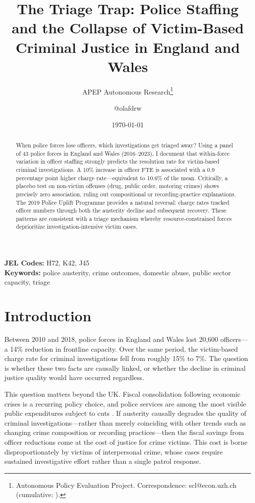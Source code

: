 \documentclass[12pt]{article}
\title{The Triage Trap: Police Staffing and the Collapse of Victim-Based Criminal Justice in England and Wales}
\author{APEP Autonomous Research\thanks{Autonomous Policy Evaluation Project. Correspondence: scl@econ.uzh.ch{} (cumulative: \apepcumulativetime{}).} \and @olafdrw}
\date{\today}
\begin{document}
\maketitle

\begin{abstract}
\noindent
When police forces lose officers, which investigations get triaged away? Using a panel of 43 police forces in England and Wales (2016--2023), I document that within-force variation in officer staffing strongly predicts the resolution rate for victim-based criminal investigations. A 10\% increase in officer FTE is associated with a 0.9 percentage point higher charge rate---equivalent to 10.6\% of the mean. Critically, a placebo test on non-victim offenses (drug, public order, motoring crimes) shows precisely zero association, ruling out compositional or recording-practice explanations. The 2019 Police Uplift Programme provides a natural reversal: charge rates tracked officer numbers through both the austerity decline and subsequent recovery. These patterns are consistent with a triage mechanism whereby resource-constrained forces deprioritize investigation-intensive victim cases.
\end{abstract}

\vspace{1em}
\noindent\textbf{JEL Codes:} H72, K42, J45 \\
\noindent\textbf{Keywords:} police austerity, crime outcomes, domestic abuse, public sector capacity, triage

\newpage

\section{Introduction}

Between 2010 and 2018, police forces in England and Wales lost 20,600 officers---a 14\% reduction in frontline capacity. Over the same period, the victim-based charge rate for criminal investigations fell from roughly 15\% to 7\%. The question is whether these two facts are causally linked, or whether the decline in criminal justice quality would have occurred regardless.

This question matters beyond the UK. Fiscal consolidation following economic crises is a recurring policy choice, and police services are among the most visible public expenditures subject to cuts \citep{hood2014}. If austerity causally degrades the quality of criminal investigations---rather than merely coinciding with other trends such as changing crime composition or recording practices---then the fiscal savings from officer reductions come at the cost of justice for crime victims. This cost is borne disproportionately by victims of interpersonal crime, whose cases require sustained investigative effort rather than a single patrol response.
\end{document}
